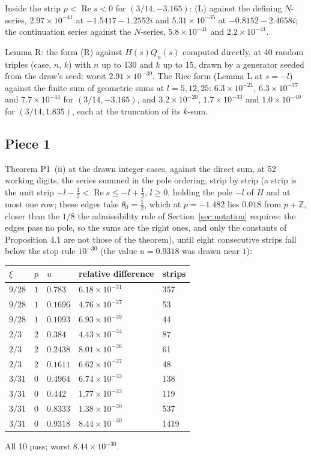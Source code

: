 \documentclass[11pt]{article}
\newcommand{\re}{\operatorname{Re}}
\begin{document}
Inside the strip $p<\re s<0$ for $(3/14,-3.165)$: (L) against the defining $N$-series, $2.97\times10^{-41}$ at $-1.5417-1.2552i$ and $5.31\times10^{-35}$ at $-0.8152-2.4658i$; the continuation series against the $N$-series, $5.8\times10^{-41}$ and $2.2\times10^{-41}$.

Lemma R: the form (R) against $H(s)Q_n(s)$ computed directly, at 40 random triples (case, $n$, $k$) with $n$ up to 130 and $k$ up to 15, drawn by a generator seeded from the draw's seed: worst $2.91\times10^{-39}$. The Rice form (Lemma L at $s=-l$) against the finite sum of geometric sums at $l=5,12,25$: $6.3\times10^{-21}$, $6.3\times10^{-37}$ and $7.7\times10^{-44}$ for $(3/14,-3.165)$, and $3.2\times10^{-20}$, $1.7\times10^{-33}$ and $1.0\times10^{-40}$ for $(3/14,1.835)$, each at the truncation of its $k$-sum.

\subsection{Piece 1}

Theorem P1~(ii) at the drawn integer cases, against the direct sum, at 52 working digits, the series summed in the pole ordering, strip by strip (a strip is the unit strip $-l-\frac12<\re s\le-l+\frac12$, $l\ge0$, holding the pole $-l$ of $H$ and at most one row; these edges take $\theta_0=\frac12$, which at $p=-1.482$ lies $0.018$ from $p+\mathbb{Z}$, closer than the $1/8$ the admissibility rule of Section~\ref{sec:notation} requires: the edges pass no pole, so the sums are the right ones, and only the constants of Proposition 4.1 are not those of the theorem), until eight consecutive strips fall below the stop rule $10^{-30}$ (the value $u=0.9318$ was drawn near $1$):
\begin{center}
\begin{tabular}{lllll}
$\xi$ & $p$ & $u$ & relative difference & strips\\
\hline
$9/28$ & $1$ & $0.783$ & $6.18\times10^{-31}$ & 357\\
$9/28$ & $1$ & $0.1696$ & $4.76\times10^{-37}$ & 53\\
$9/28$ & $1$ & $0.1093$ & $6.93\times10^{-39}$ & 44\\
$2/3$ & $2$ & $0.384$ & $4.43\times10^{-34}$ & 87\\
$2/3$ & $2$ & $0.2438$ & $8.01\times10^{-36}$ & 61\\
$2/3$ & $2$ & $0.1611$ & $6.62\times10^{-37}$ & 48\\
$3/31$ & $0$ & $0.4964$ & $6.74\times10^{-33}$ & 138\\
$3/31$ & $0$ & $0.442$ & $1.77\times10^{-33}$ & 119\\
$3/31$ & $0$ & $0.8333$ & $1.38\times10^{-30}$ & 537\\
$3/31$ & $0$ & $0.9318$ & $8.44\times10^{-30}$ & 1419\\
\end{tabular}
\end{center}
All 10 pass; worst $8.44\times10^{-30}$.
\end{document}

